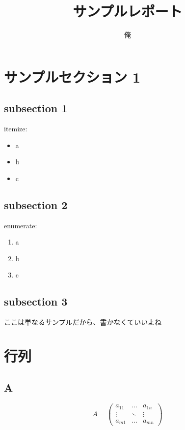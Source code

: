 \documentclass[twocolumn]{jsarticle}
\begin{document}
	\title{サンプルレポート}
	\author{俺}
	\maketitle
    
	\section{サンプルセクション 1}
        		\subsection{subsection 1}
            	itemize: 
            
                \begin{itemize}
                    	\item a
                    	\item b
                    	\item c
                \end{itemize}
	\subsection{subsection 2}
        		enumerate:
		
		\begin{enumerate}
			\item a
			\item b
			\item c \cite{A}
		\end{enumerate}
        \subsection{subsection 3}
		ここは単なるサンプルだから、書かなくていいよね
    
	\section{行列}
		\subsection{A}
			\begin{equation*}
				A = 
				\begin{pmatrix}
					a_{11} & \ldots & a_{1n} \\
					\vdots & \ddots & \vdots \\
					a_{m1} & \ldots & a_{mn}
				\end{pmatrix}
			\end{equation*}
			
\end{document}

